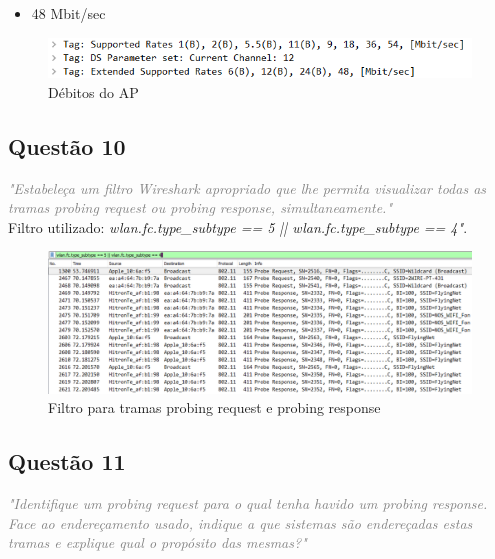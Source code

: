 \documentclass{llncs}
\newcommand{\questionE}[1]{\textcolor{gray}{\textit{"#1"}}}
\begin{document}
\begin{itemize}
    \item 48 Mbit/sec 
\end{itemize}

\begin{figure}[H]
\begin{center}
\includegraphics[width=12cm]{9.PNG}
\end{center}
\caption{Débitos do AP}
\end{figure}

\clearpage

\subsection*{Questão 10}
\hspace{3mm} 
\questionE{Estabeleça um filtro Wireshark apropriado que lhe permita visualizar todas as tramas probing request ou probing response, simultaneamente.}\\ 

Filtro utilizado: \textit{wlan.fc.type\_subtype == 5 || wlan.fc.type\_subtype == 4"}.

\begin{figure}[H]
\begin{center}
\includegraphics[width=12cm]{10.PNG}
\end{center}
\caption{Filtro para tramas probing request e probing response}
\end{figure}

\subsection*{Questão 11}
\hspace{3mm} 
\questionE{Identifique um probing request para o qual tenha havido um probing response. Face ao endereçamento usado, indique a que sistemas são endereçadas estas tramas e explique qual o propósito das mesmas?}\\
\end{document}
